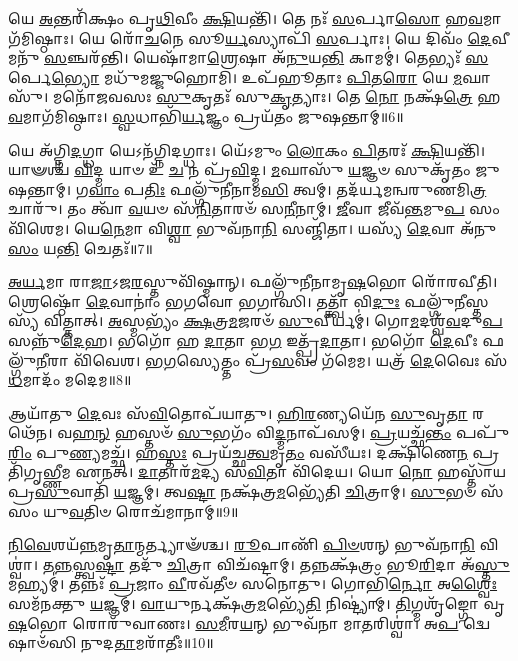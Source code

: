 𑌯𑍇 \ul{𑌅}\-𑌨𑍍𑌤𑌰𑌿᳴𑌕𑍍𑌷𑌂 𑌪𑍃\-\ul{𑌥𑌿}\-𑌵𑍀𑌂 \ul{𑌕𑍍𑌷𑌿}\-𑌯𑌨𑍍𑌤𑌿᳴।
𑌤𑍇 𑌨𑌃᳴ \ul{𑌸}\-𑌰𑍍𑌪𑌾\-\ul{𑌸𑍋} 𑌹\-\ul{𑌵}\-𑌮𑌾𑌗᳴𑌮𑌿𑌷𑍍𑌠𑌾𑌃।
𑌯𑍇 𑌰𑍋᳴\-\ul{𑌚}\-𑌨𑍇 𑌸𑍂\-\ul{𑌰𑍍𑌯}\-𑌸𑍍𑌯𑌾𑌪𑌿᳴ \ul{𑌸}\-𑌰𑍍𑌪𑌾𑌃।
𑌯𑍇 𑌦𑌿𑌵𑌂᳴ \ul{𑌦𑍇}\-𑌵𑍀𑌮𑌨𑍁᳴ \ul{𑌸}\-𑌞𑍍𑌚𑌰᳴𑌨𑍍𑌤𑌿।
𑌯𑍇𑌷𑌾᳴𑌮𑌾\-\ul{𑌶𑍍𑌰𑍇}\-𑌷𑌾 𑌅᳴\-\ul{𑌨𑍁}\-𑌯\-\ul{𑌨𑍍𑌤𑌿} 𑌕𑌾𑌮𑌮𑍍॑।
𑌤𑍇𑌭𑍍𑌯𑌃᳴ \ul{𑌸}\-𑌰𑍍𑌪𑍇\-\ul{𑌭𑍍𑌯𑍋} 𑌮𑌧𑍁᳴𑌮𑌜𑍍𑌜𑍁𑌹𑍋𑌮𑌿।
𑌉𑌪᳴𑌹𑍂𑌤𑌾𑌃 \ul{𑌪𑌿}\-𑌤\-\ul{𑌰𑍋} 𑌯𑍇 \ul{𑌮}\-𑌘𑌾𑌸𑍁᳴।
𑌮𑌨𑍋᳴𑌜𑌵𑌸𑌃 \ul{𑌸𑍁}\-𑌕𑍃𑌤𑌃᳴ 𑌸𑍁\-\ul{𑌕𑍃}\-𑌤𑍍𑌯𑌾𑌃।
𑌤𑍇 \ul{𑌨𑍋} 𑌨𑌕𑍍𑌷᳴\-\ul{𑌤𑍍𑌰𑍇} 𑌹\-\ul{𑌵}\-𑌮𑌾𑌗᳴𑌮𑌿𑌷𑍍𑌠𑌾𑌃।
\-\ul{𑌸𑍍𑌵}\-𑌧𑌾𑌭𑌿᳴\-\ul{𑌰𑍍𑌯}\-𑌜𑍍𑌞𑌂 𑌪𑍍𑌰𑌯᳴𑌤𑌂 𑌜𑍁𑌷𑌨𑍍𑌤𑌾𑌮𑍍॥6॥

𑌯𑍇 𑌅᳴𑌗𑍍𑌨𑌿\-\ul{𑌦}\-𑌗𑍍𑌧𑌾 𑌯𑍇𑌽𑌨᳴𑌗𑍍𑌨𑌿𑌦𑌗𑍍𑌧𑌾𑌃।
𑌯𑍇᳴𑌽𑌮𑍁𑌂 \ul{𑌲𑍋}\-𑌕𑌂 \ul{𑌪𑌿}\-𑌤𑌰𑌃᳴ \ul{𑌕𑍍𑌷𑌿}\-𑌯𑌨𑍍𑌤𑌿᳴।
𑌯𑌾𑍟𑌶𑍍𑌚᳴ \ul{𑌵𑌿}\-𑌦𑍍𑌮 𑌯𑌾𑍞 𑌉᳴ \ul{𑌚} 𑌨 𑌪𑍍𑌰᳴\-\ul{𑌵𑌿}\-𑌦𑍍𑌮।
\-\ul{𑌮}\-𑌘𑌾𑌸𑍁᳴ \ul{𑌯}\-𑌜𑍍𑌞𑍞 𑌸𑍁𑌕𑍃᳴𑌤𑌂 𑌜𑍁𑌷𑌨𑍍𑌤𑌾𑌮𑍍।
𑌗\-\ul{𑌵𑌾𑌂} 𑌪\-\ul{𑌤𑌿𑌃} 𑌫𑌲𑍍𑌗𑍁᳴𑌨𑍀𑌨𑌾𑌮\-\ul{𑌸𑌿} 𑌤𑍍𑌵𑌮𑍍।
𑌤𑌦᳴𑌰𑍍𑌯𑌮𑌨𑍍𑌵𑌰𑍁𑌣𑌮𑌿\-\ul{𑌤𑍍𑌰} 𑌚𑌾𑌰𑍁᳴।
𑌤𑌂 𑌤𑍍𑌵𑌾᳴ \ul{𑌵}\-𑌯𑍞 𑌸᳴\-\ul{𑌨𑌿}\-𑌤𑌾𑌰𑍞᳴ 𑌸\-\ul{𑌨𑍀}\-𑌨𑌾𑌮𑍍।
\-\ul{𑌜𑍀}\-𑌵𑌾 𑌜𑍀𑌵᳴\-\ul{𑌨𑍍𑌤}\-𑌮𑍁\-\ul{𑌪} 𑌸𑌂𑌵𑌿᳴𑌶𑍇𑌮।
𑌯𑍇\-\ul{𑌨𑍇}\-𑌮𑌾 𑌵𑌿\-\ul{𑌶𑍍𑌵𑌾} 𑌭𑍁𑌵᳴𑌨𑌾\-\ul{𑌨𑌿} 𑌸𑌞𑍍𑌜𑌿᳴𑌤𑌾।
𑌯𑌸𑍍𑌯᳴ \ul{𑌦𑍇}\-𑌵𑌾 𑌅᳴𑌨𑍁 \ul{𑌸𑌂} 𑌯\-\ul{𑌨𑍍𑌤𑌿} 𑌚𑍇𑌤𑌃᳴॥7॥

\-\ul{𑌅}\-\-\ul{𑌰𑍍𑌯}\-𑌮𑌾 𑌰𑌾\-\ul{𑌜𑌾}\-\-𑌽𑌜\-\ul{𑌰}\-𑌸𑍍𑌤𑍁𑌵𑌿᳴𑌷𑍍𑌮𑌾𑌨𑍍।
𑌫𑌲𑍍𑌗𑍁᳴𑌨𑍀𑌨𑌾𑌮𑍃\-\ul{𑌷}\-𑌭𑍋 𑌰𑍋᳴𑌰𑌵𑍀𑌤𑌿।
𑌶𑍍𑌰𑍇𑌷𑍍𑌠𑍋᳴ \ul{𑌦𑍇}\-𑌵𑌾𑌨𑌾𑌂॑ 𑌭𑌗𑌵𑍋 𑌭𑌗𑌾𑌸𑌿।
𑌤𑌤𑍍𑌤𑍍𑌵𑌾᳴ 𑌵𑌿\-\ul{𑌦𑍁𑌃} 𑌫𑌲𑍍𑌗𑍁᳴\-\ul{𑌨𑍀}\-𑌸𑍍𑌤𑌸𑍍𑌯᳴ 𑌵𑌿𑌤𑍍𑌤𑌾𑌤𑍍।
\-\ul{𑌅}\-𑌸𑍍𑌮𑌭𑍍𑌯𑌂᳴ \ul{𑌕𑍍𑌷}\-𑌤𑍍𑌰\-\ul{𑌮}\-𑌜𑌰𑍞᳴ \ul{𑌸𑍁}\-𑌵𑍀𑌰𑍍𑌯𑌮𑍍॑।
𑌗𑍋\-\ul{𑌮}\-𑌦𑌶𑍍𑌵᳴\-\ul{𑌵}\-𑌦𑍁\-\ul{𑌪} 𑌸𑌨𑍍𑌨𑍁᳴\-\-\ul{𑌦𑍇}\-𑌹।
𑌭𑌗𑍋᳴ 𑌹 \ul{𑌦𑌾}\-𑌤𑌾 𑌭\-\ul{𑌗} 𑌇𑌤𑍍𑌪𑍍𑌰᳴\-\ul{𑌦𑌾}\-𑌤𑌾।
𑌭𑌗𑍋᳴ \ul{𑌦𑍇}\-𑌵𑍀𑌃 𑌫𑌲𑍍𑌗𑍁᳴\-\ul{𑌨𑍀}\-𑌰𑌾 𑌵𑌿᳴𑌵𑍇𑌶।
𑌭\-\ul{𑌗}\-𑌸𑍍𑌯𑍇𑌤𑍍𑌤𑌂 𑌪𑍍𑌰᳴\-\ul{𑌸}\-𑌵𑌂 𑌗᳴𑌮𑍇𑌮।
𑌯𑌤𑍍𑌰᳴ \ul{𑌦𑍇}\-𑌵𑍈𑌃 𑌸᳴\-\ul{𑌧}\-𑌮𑌾𑌦𑌂᳴ 𑌮𑌦𑍇𑌮॥8॥

𑌆𑌯𑌾᳴𑌤𑍁 \ul{𑌦𑍇}\-𑌵𑌃 𑌸᳴\-\ul{𑌵𑌿}\-𑌤𑍋𑌪᳴𑌯𑌾𑌤𑍁।
\-\ul{𑌹𑌿}\-\-\ul{𑌰}\-𑌣𑍍𑌯𑌯𑍇᳴𑌨 \ul{𑌸𑍁}\-𑌵𑍃\-\ul{𑌤𑌾} 𑌰𑌥𑍇᳴𑌨।
𑌵\-\ul{𑌹}\-\-\ul{𑌨𑍍} 𑌹𑌸𑍍𑌤𑍞᳴ \ul{𑌸𑍁}\-𑌭𑌗𑌂᳴ 𑌵𑌿\-\ul{𑌦𑍍𑌮}\-𑌨𑌾𑌪᳴𑌸𑌮𑍍।
\-\ul{𑌪𑍍𑌰}\-𑌯𑌚𑍍𑌛᳴\-\ul{𑌨𑍍𑌤𑌂} 𑌪𑌪𑍁᳴\-\ul{𑌰𑌿𑌂} 𑌪𑍁\-\ul{𑌣𑍍𑌯}\-𑌮𑌚𑍍𑌛᳴।
𑌹\-\ul{𑌸𑍍𑌤𑌃} 𑌪𑍍𑌰𑌯᳴𑌚𑍍𑌛\-\ul{𑌤𑍍𑌵}\-𑌮𑍃\-\ul{𑌤𑌂} 𑌵𑌸𑍀᳴𑌯𑌃।
𑌦𑌕𑍍𑌷𑌿᳴𑌣𑍇\-\ul{𑌨} 𑌪𑍍𑌰𑌤𑌿᳴\-𑌗𑍃𑌭𑍍𑌣𑍀𑌮 𑌏𑌨𑌤𑍍।
\-\ul{𑌦𑌾}\-𑌤𑌾𑌰᳴\-\ul{𑌮}\-𑌦𑍍𑌯 𑌸᳴\-\ul{𑌵𑌿}\-𑌤𑌾 𑌵𑌿᳴𑌦𑍇𑌯।
𑌯𑍋 \ul{𑌨𑍋} 𑌹𑌸𑍍𑌤𑌾᳴𑌯 𑌪𑍍𑌰\-\ul{𑌸𑍁}\-𑌵𑌾𑌤𑌿᳴ \ul{𑌯}\-𑌜𑍍𑌞𑌮𑍍।
𑌤𑍍𑌵\-\ul{𑌷𑍍𑌟𑌾} 𑌨𑌕𑍍𑌷᳴𑌤𑍍𑌰\-\ul{𑌮}\-𑌭𑍍𑌯𑍇᳴𑌤𑌿 \ul{𑌚𑌿}\-𑌤𑍍𑌰𑌾𑌮𑍍।
\-\ul{𑌸𑍁}\-𑌭𑍞 𑌸᳴𑌸𑌂 𑌯𑍁\-\ul{𑌵}\-𑌤𑌿𑍞 𑌰𑍋𑌚᳴𑌮𑌾𑌨𑌾𑌮𑍍॥9॥

\-\ul{𑌨𑌿}\-\-\ul{𑌵𑍇}\-𑌶𑌯᳴\-\ul{𑌨𑍍𑌨}\-\-𑌮𑍃\-\ul{𑌤𑌾}\-𑌨𑍍𑌮𑌰𑍍𑌤𑍍𑌯𑌾𑍟᳴𑌶𑍍𑌚।
\-\ul{𑌰𑍂}\-𑌪𑌾𑌣𑌿᳴ \ul{𑌪𑌿}\-\-\ul{𑍞}\-𑌶𑌨𑍍 𑌭𑍁𑌵᳴𑌨𑌾\-\ul{𑌨𑌿} 𑌵𑌿𑌶𑍍𑌵𑌾॑।
𑌤\-\ul{𑌨𑍍𑌨}\-𑌸𑍍𑌤𑍍𑌵\-\ul{𑌷𑍍𑌟𑌾} 𑌤𑌦𑍁᳴ \ul{𑌚𑌿}\-𑌤𑍍𑌰𑌾 𑌵𑌿𑌚᳴𑌷𑍍𑌟𑌾𑌮𑍍।
𑌤𑌨𑍍𑌨𑌕𑍍𑌷᳴𑌤𑍍𑌰𑌂 𑌭𑍂\-\ul{𑌰𑌿}\-𑌦𑌾 𑌅᳴\-\ul{𑌸𑍍𑌤𑍁} 𑌮𑌹𑍍𑌯𑌮𑍍॑।
𑌤𑌨𑍍𑌨𑌃᳴ \ul{𑌪𑍍𑌰}\-𑌜𑌾𑌂 \ul{𑌵𑍀}\-𑌰𑌵᳴𑌤𑍀𑍞 𑌸𑌨𑍋𑌤𑍁।
𑌗𑍋𑌭𑌿᳴\-\ul{𑌰𑍍𑌨𑍋} 𑌅\-\ul{𑌶𑍍𑌵𑍈𑌃} 𑌸𑌮᳴𑌨𑌕𑍍𑌤𑍁 \ul{𑌯}\-𑌜𑍍𑌞𑌮𑍍।
\-\ul{𑌵𑌾}\-𑌯𑍁𑌰𑍍𑌨𑌕𑍍𑌷᳴𑌤𑍍𑌰\-\ul{𑌮}\-𑌭𑍍𑌯𑍇᳴\-\ul{𑌤𑌿} 𑌨𑌿𑌷𑍍𑌟𑍍𑌯𑌾॑𑌮𑍍।
\-\ul{𑌤𑌿}\-𑌗𑍍𑌮𑌶𑍃᳴𑌙𑍍𑌗𑍋 𑌵𑍃\-\ul{𑌷}\-𑌭𑍋 𑌰𑍋𑌰𑍁᳴𑌵𑌾𑌣𑌃।
\-\ul{𑌸}\-\-\ul{𑌮𑍀}\-𑌰\-\ul{𑌯}\-𑌨𑍍 𑌭𑍁𑌵᳴𑌨𑌾 𑌮𑌾\-\ul{𑌤}\-𑌰𑌿𑌶𑍍𑌵𑌾॑।
𑌅\-\ul{𑌪} 𑌦𑍍𑌵𑍇𑌷𑌾𑍞᳴𑌸𑌿 𑌨𑍁𑌦\-\ul{𑌤𑌾}\-𑌮𑌰𑌾᳴𑌤𑍀𑌃॥10॥

